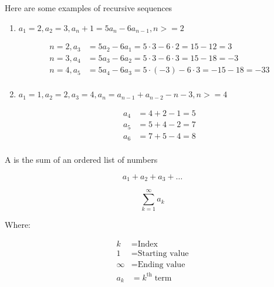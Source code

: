 \documentclass[../../Main.tex]{subfiles}
\begin{document}
\begin{example}

    Here are some examples of recursive sequences

    \begin{enumerate}
        \item 
        {
            $ a_1 = 2, a_2 = 3, a_n+1 = 5a_n - 6a_{n-1}, n >= 2 $

            \begin{align*}
                n = 2, a_3 &= 5a_2 - 6a_1 = 5 \cdot 3 - 6 \cdot 2 = 15 - 12 = 3 \\
                n = 3, a_4 &= 5a_3 - 6a_2 = 5 \cdot 3 - 6 \cdot 3 = 15 - 18 = -3 \\
                n = 4, a_5 &= 5a_4 - 6a_3 = 5 \cdot (-3) - 6 \cdot 3 = -15 - 18 = -33 \\
            \end{align*}
        }

        \item 
        {
            $ a_1 = 1, a_2 = 2, a_3 = 4, a_n = a_{n-1} + a_{n-2} - n - 3, n >= 4$
            
            \begin{align*}
                a_4 &= 4 + 2 - 1 = 5 \\
                a_5 &= 5 + 4 - 2 = 7 \\
                a_6 &= 7 + 5 - 4 = 8 \\
            \end{align*}
        }

    \end{enumerate}
\end{example}

\begin{definition}[Series]
    A  is the sum of an ordered list of numbers
    
    $$ a_1 + a_2 + a_3 + \ldots $$

    \[
    \sum_{k = 1}^{\infty} a_k
    \]

    Where:

    \begin{align*}
        k &= \text{Index} \\
        1 &= \text{Starting value} \\
        \infty &= \text{Ending value} \\
        a_k &= k^\text{th} \; \text{term} \\
    \end{align*}
    
\end{definition}
\end{document}
